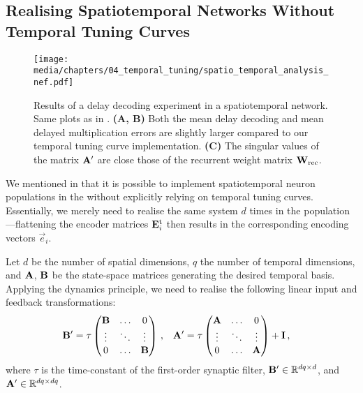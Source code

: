 \subsection{Realising Spatiotemporal Networks Without Temporal Tuning Curves}
\label{app:spatiotemporal_nef}

\begin{figure}[b]
	\centering
	\texttt{[image: media/chapters/04\_temporal\_tuning/spatio\_temporal\_analysis\_nef.pdf]}
	\caption[Results of a delay decoding experiment in a spatiotemporal NEF network]{Results of a delay decoding experiment in a spatiotemporal \NEF network. Same plots as in .
	\textbf{(A, B)} Both the mean delay decoding and mean delayed multiplication errors are slightly larger compared to our temporal tuning curve implementation.
	\textbf{(C)} The singular values of the matrix $\mathbf{A}'$ are close those of the recurrent weight matrix $\mathbf{W}_\mathrm{rec}$.
	}
	\label{fig:spatio_temporal_analysis_nef}
\end{figure}

We mentioned in  that it is possible to implement spatiotemporal neuron populations in the \NEF without explicitly relying on temporal tuning curves.
Essentially, we merely need to realise the same \LTI system $d$ times in the population---flattening the encoder matrices $\mathbf{E}^\mathrm{t}_i$ then results in the corresponding \NEF encoding vectors $\vec e_i$.

Let $d$ be the number of spatial dimensions, $q$ the number of temporal dimensions, and $\mathbf{A}$, $\mathbf{B}$ be the state-space matrices generating the desired temporal basis.
Applying the \NEF dynamics principle, we need to realise the following linear input and feedback transformations:
\begin{align*}
	\mathbf{B}' &= \tau \begin{pmatrix}
		\mathbf{B} & \hdots & 0 \\
		\vdots & \ddots & \vdots \\
		0 & \hdots & \mathbf{B}
	\end{pmatrix} \,, &
	\mathbf{A}' &= \tau \begin{pmatrix}
		\mathbf{A} & \hdots & 0 \\
		\vdots & \ddots & \vdots \\
		0 & \hdots & \mathbf{A}
	\end{pmatrix} + \mathbf{I} \,,
\end{align*}
where $\tau$ is the time-constant of the first-order synaptic filter, $\mathbf{B}' \in \mathbb{R}^{dq \times d}$, and $\mathbf{A}' \in \mathbb{R}^{dq \times dq}$.

